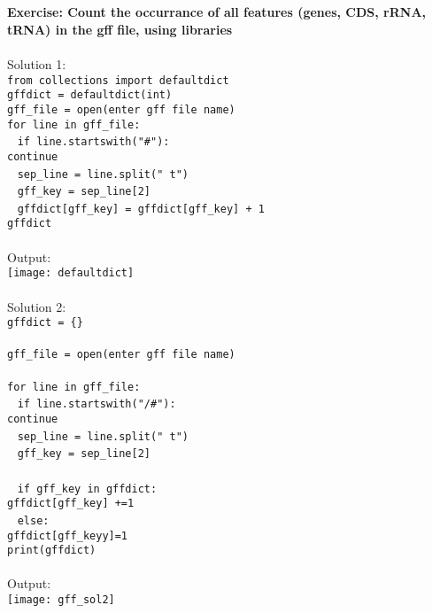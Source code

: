 \documentclass{article}
\begin{document}
{{{\\
\\
\textbf{Exercise: Count the occurrance of all features (genes, CDS, rRNA, tRNA) in the gff file, using libraries }\\
\\
Solution 1:\\
\texttt{from collections import defaultdict}\\
\texttt{gffdict = defaultdict(int)}\\
\texttt{gff\_file = open(enter gff file name)}\\
\texttt{for line in gff\_file:}\\
\indent ~ \texttt{if line.startswith("\#"):}\\
\indent \indent \texttt{continue}\\
\indent ~ \texttt{sep\_line = line.split(" t")} \\
\indent ~ \texttt{gff\_key = sep\_line[2]}\\
\indent ~ \texttt{gffdict[gff\_key] = gffdict[gff\_key] + 1}\\
\texttt{gffdict} \\
\\
Output:\\
\texttt{[image: defaultdict]}\\
\\
Solution 2:\\
\texttt{gffdict = \{\}} \\
\\
\texttt{gff\_file = open(enter gff file name)} \\
\\
\texttt{for line in gff\_file:}\\
\indent ~ \texttt{if line.startswith("/#"):} \\
\indent \indent \texttt{continue} \\
\indent ~ \texttt{sep\_line = line.split(" t")} \\
\indent ~ \texttt{gff\_key = sep\_line[2]}\\
\\
\indent ~ \texttt{if gff\_key in gffdict:}\\
\indent \indent \texttt{gffdict[gff\_key] +=1 }\\
\indent ~ \texttt{else:}\\
\indent \indent \texttt{gffdict[gff\_keyy]=1}\\
\texttt{print(gffdict)}\\
\\
Output:\\
\texttt{[image: gff\_sol2]}\\


}}}
\end{document}
